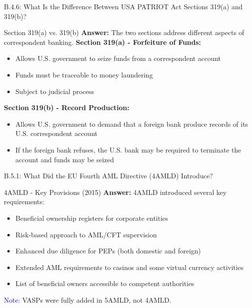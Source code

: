 \documentclass{beamer}
\begin{document}
	\begin{frame}{B.4.6: What Is the Difference Between USA PATRIOT Act Sections 319(a) and 319(b)?}
		\begin{block}{Section 319(a) vs. 319(b)}
			\textbf{Answer:} The two sections address different aspects of correspondent banking.
			\vspace{0.2cm}
			\textbf{Section 319(a) - Forfeiture of Funds:}
			\begin{itemize}
				\item Allows U.S. government to seize funds from a correspondent account
				\item Funds must be traceable to money laundering
				\item Subject to judicial process
			\end{itemize}
			\textbf{Section 319(b) - Record Production:}
			\begin{itemize}
				\item Allows U.S. government to demand that a foreign bank produce records of its U.S. correspondent account
				\item If the foreign bank refuses, the U.S. bank may be required to terminate the account and funds may be seized
			\end{itemize}
		\end{block}
	\end{frame}
	
	
	\begin{frame}{B.5.1: What Did the EU Fourth AML Directive (4AMLD) Introduce?}
		\begin{block}{4AMLD - Key Provisions (2015)}
			\textbf{Answer:} 4AMLD introduced several key requirements:
			\vspace{0.2cm}
			\begin{itemize}
				\item Beneficial ownership registers for corporate entities
				\item Risk-based approach to AML/CFT supervision
				\item Enhanced due diligence for PEPs (both domestic and foreign)
				\item Extended AML requirements to casinos and some virtual currency activities
				\item List of beneficial owners accessible to competent authorities
			\end{itemize}
			\textcolor{blue}{Note:} VASPs were fully added in 5AMLD, not 4AMLD.
		\end{block}
	\end{frame}
	
\end{document}
